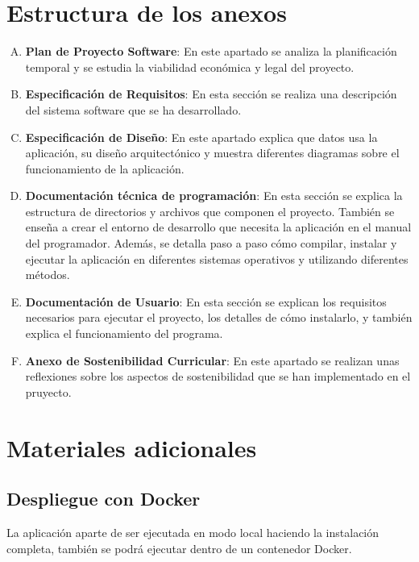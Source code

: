 \section{Estructura de los anexos}
\begin{enumerate}[A.]
    \item \textbf{Plan de Proyecto Software}: En este apartado se analiza la planificación temporal y se estudia la viabilidad económica y legal del proyecto.
    \item \textbf{Especificación de Requisitos}: En esta sección se realiza una descripción del sistema software que se ha desarrollado.
    \item \textbf{Especificación de Diseño}: En este apartado explica que datos usa la aplicación, su diseño arquitectónico y muestra diferentes diagramas sobre el funcionamiento de la aplicación.
    \item \textbf{Documentación técnica de programación}: En esta sección se explica la estructura de directorios y archivos que componen el proyecto. También se enseña a crear el entorno de desarrollo que necesita la aplicación en el manual del programador. Además, se detalla paso a paso cómo compilar, instalar y ejecutar la aplicación en diferentes sistemas operativos y utilizando diferentes métodos.
    \item \textbf{Documentación de Usuario}: En esta sección se explican los requisitos necesarios para ejecutar el proyecto, los detalles de cómo instalarlo, y también explica el funcionamiento del programa.
    \item \textbf{Anexo de Sostenibilidad Curricular}: En este apartado se realizan unas reflexiones sobre los aspectos de sostenibilidad que se han implementado en el pruyecto.
\end{enumerate}

\section{Materiales adicionales}
\subsection{Despliegue con Docker}
La aplicación aparte de ser ejecutada en modo local haciendo la instalación completa, también se podrá ejecutar dentro de un contenedor Docker.